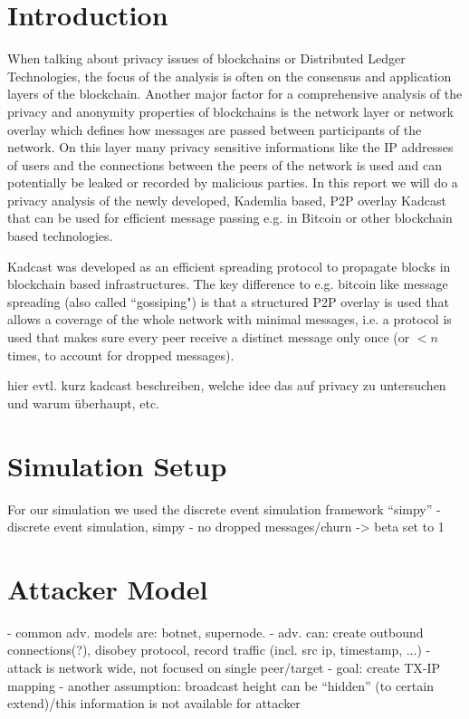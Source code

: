 \section{Introduction}
When talking about privacy issues of blockchains or Distributed Ledger Technologies, the
focus of the analysis is often on the consensus and application layers of the blockchain.
Another major factor for a comprehensive analysis of the privacy and anonymity properties
of blockchains is the network layer or network overlay which defines how messages are passed
between participants of the network. On this layer many privacy sensitive informations
like the IP addresses of users and the connections between the peers of the network
is used and can potentially be leaked or recorded by malicious parties.
In this report we will do a privacy analysis of the newly developed, Kademlia based,
P2P overlay Kadcast that can be used for efficient message passing
e.g. in Bitcoin or other blockchain based technologies.

Kadcast was developed as an efficient spreading protocol to propagate blocks in blockchain based infrastructures.
The key difference to e.g. bitcoin like message spreading (also called ``gossiping")
is that a structured P2P overlay is used that allows a coverage of the whole network with minimal messages,
i.e. a protocol is used that makes sure every peer receive a distinct message only once
(or $<n$ times, to account for dropped messages). %

hier evtl. kurz kadcast beschreiben, welche idee das auf privacy zu untersuchen und warum überhaupt, etc.

\section{Simulation Setup}
For our simulation we used the discrete event simulation framework ``simpy''
- discrete event simulation, simpy
- no dropped messages/churn -> beta set to 1


\section{Attacker Model}
- common adv. models are: botnet, supernode.
- adv. can: create outbound connections(?), disobey protocol, record traffic (incl. src ip, timestamp, ...)
- attack is network wide, not focused on single peer/target
- goal: create TX-IP mapping
- another assumption: broadcast height can be ``hidden'' (to certain extend)/this information is not available for attacker

